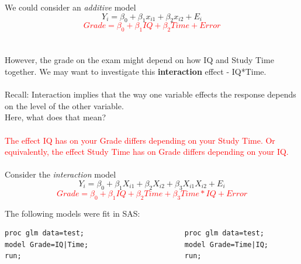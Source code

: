 We could consider an \textit{additive} model
$$Y_i=\beta_0+\beta_1x_{i1} +\beta_2x_{i2}+E_i$$%
\textcolor{red}{$$Grade=\beta_0+\beta_1IQ +\beta_2Time+Error$$~\\~\\}
However, the grade on the exam might depend on how IQ and Study Time together. We may want to investigate this \textbf{interaction} effect - IQ*Time.\\~\\

Recall: Interaction implies that the way one variable effects the response depends on the level of the other variable.\\

Here, what does that mean?%
\textcolor{red}{\\~\\The effect IQ has on your Grade differs depending on your Study Time.  Or equivalently, the effect Study Time has on Grade differs depending on your IQ.}\\~\\

Consider the \textit{interaction} model
$$Y_i=\beta_0+\beta_1X_{i1} +\beta_2X_{i2}+\beta_3X_{i1}X_{i2}+E_i$$%
\textcolor{red}{$$Grade=\beta_0+\beta_1IQ +\beta_2Time+\beta_3Time*IQ+Error$$}

\newpage

The following models were fit in SAS:
\begin{small}
\begin{verbatim}
proc glm data=test;                        proc glm data=test;
model Grade=IQ|Time;                       model Grade=Time|IQ;
run;                                       run;
\end{verbatim}
\end{small}

